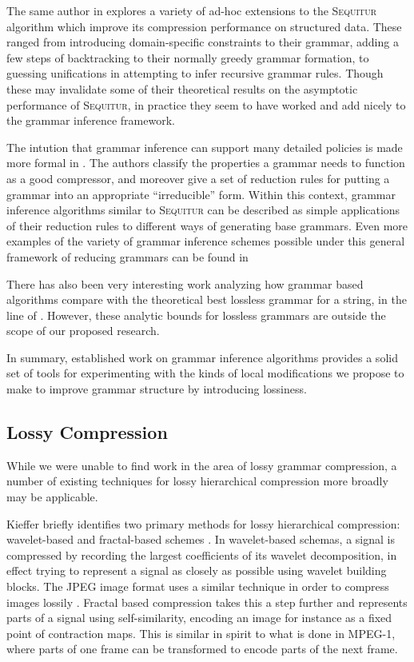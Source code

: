 \documentclass[11pt]{article}
\newcommand{\Sequitur}{\textsc{Sequitur}\xspace}
\begin{document}
The same author in \cite{nevillphd} explores a variety of ad-hoc extensions to
the \Sequitur algorithm which improve its compression performance on structured
data.  These ranged from introducing domain-specific constraints to their
grammar, adding a few steps of backtracking to their normally greedy grammar
formation, to guessing unifications in attempting to infer recursive grammar
rules.  Though these may invalidate some of their theoretical results on the
asymptotic performance of \Sequitur, in practice they seem to have worked and
add nicely to the grammar inference framework.

The intution that grammar inference can support many detailed policies is made
more formal in \cite{grammarcodes}.  The authors classify the properties a
grammar needs to function as a good compressor, and moreover give a set of
reduction rules for putting a grammar into an appropriate ``irreducible'' form.
Within this context, grammar inference algorithms similar to \Sequitur can be
described as simple applications of their reduction rules to different ways of
generating base grammars.  Even more examples of the variety of grammar
inference schemes possible under this general framework of reducing grammars
can be found in \cite{efficientgreedy}

There has also been very interesting work analyzing how grammar based
algorithms compare with the theoretical best lossless grammar for a string, in
the line of \cite{approximation}.  However, these analytic bounds for lossless
grammars are outside the scope of our proposed research.

In summary, established work on grammar inference algorithms provides a solid
set of tools for experimenting with the kinds of local modifications we propose
to make to improve grammar structure by introducing lossiness.

\subsection{Lossy Compression}

While we were unable to find work in the area of lossy grammar compression, a
number of existing techniques for lossy hierarchical compression more broadly
may be applicable.

Kieffer briefly identifies two primary methods for lossy hierarchical
compression: wavelet-based and fractal-based schemes \cite{tutorial}.  In
wavelet-based schemas, a signal is compressed by recording the largest
coefficients of its wavelet decomposition, in effect trying to represent a
signal as closely as possible using wavelet building blocks. The JPEG image
format uses a similar technique in order to compress images lossily
\cite{jpeg}. Fractal based compression takes this a step further and represents
parts of a signal using self-similarity, encoding an image for instance as a
fixed point of contraction maps. This is similar in spirit to what is done in
MPEG-1, where parts of one frame can be transformed to encode parts of the next
frame.
\end{document}
